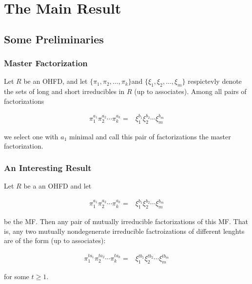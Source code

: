 \section{The Main Result}

\subsection{Some Preliminaries }

\begin{frame}
  \frametitle{Master Factorization }
  \begin{definition}%
    Let $R$ be an OHFD, and let $\{\pi_{1},\pi_{2},\ldots,\pi_{k}\}$and
    $\{\xi_{1},\xi_{2},\ldots,\xi_{m}\}$ respictevly denote the sets
    of long and short irreducibles in $R$ (up to associates). Among all
    pairs of factorizations

    \begin{align*}
      \pi_{1}^{a_{1}}\pi_{2}^{a_{2}}\cdots\pi_{k}^{a_{k}}= & \xi_{1}^{b_{1}}\xi_{2}^{b_{2}}\cdots\xi_{m}^{b_{m}}
    \end{align*}

    we select one with $a_{1}$ minimal and call this pair of factorizations
    the master factorization.


  \end{definition}%

\end{frame}

\begin{frame}
  \frametitle{An Interesting Result }
  \begin{fact}%
    Let $R$ be a an OHFD and let

    \begin{align*}
      \pi_{1}^{a_{1}}\pi_{2}^{a_{2}}\cdots\pi_{k}^{a_{k}}= & \xi_{1}^{b_{1}}\xi_{2}^{b_{2}}\cdots\xi_{m}^{b_{m}}
    \end{align*}

    be the MF. Then any pair of mutually irreducible factorizations of
    this MF. That is, any two mutually nondegenerate irreducible factroizations
    of different lenghts are of the form (up to associates):

    \begin{align*}
      \pi_{1}^{ta_{1}}\pi_{2}^{ta_{2}}\cdots\pi_{k}^{ta_{k}}= & \xi_{1}^{tb_{1}}\xi_{2}^{tb_{2}}\cdots\xi_{m}^{tb_{m}}
    \end{align*}

    for some $t\geq1$.
  \end{fact}%

\end{frame}

